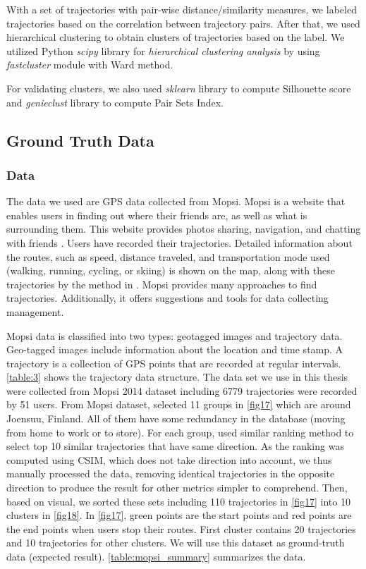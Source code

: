 \documentclass[a4paper, 12pt]{article}
\begin{document}
With a set of trajectories with pair-wise distance/similarity measures, we labeled trajectories based on the correlation between trajectory pairs. After that, we used hierarchical clustering to obtain clusters of trajectories based on the label. We utilized Python \textit{scipy} library for \textit{hierarchical clustering analysis} by using \textit{fastcluster} module with Ward method.

For validating clusters, we also used \textit{sklearn} library to compute Silhouette score and \textit{genieclust} library to compute Pair Sets Index.

\subsection{Ground Truth Data}

\subsubsection{Data}

The data we used are GPS data collected from Mopsi. Mopsi is a website that enables users in finding out where their friends are, as well as what is surrounding them. This website provides photos sharing, navigation, and chatting with friends \citep{mariescu2013detecting}. Users have recorded their trajectories. Detailed information about the routes, such as speed, distance traveled, and transportation mode used (walking, running, cycling, or skiing) is shown on the map, along with these trajectories by the method in \cite{waga2012detecting}. Mopsi provides many approaches to find trajectories. Additionally, it offers suggestions and tools for data collecting management. 

Mopsi data is classified into two types: geotagged images and trajectory data. Geo-tagged images include information about the location and time stamp. A trajectory is a collection of GPS points that are recorded at regular intervals. \autoref{table:3} shows the trajectory data structure. The data set we use in this thesis were collected from Mopsi 2014 dataset \citep{mariescu2017grid} including 6779 trajectories were recorded by 51 users. From Mopsi dataset, \cite{mariescu2020context} selected 11 groups in \autoref{fig17} which are around Joensuu, Finland. All of them have some redundancy in the database (moving from home to work or to store). For each group, \cite{mariescu2020context} used similar ranking method \citep{mariescu2014low} to select top 10 similar trajectories that have same direction. As the ranking was computed using CSIM, which does not take direction into account, we thus manually processed the data, removing identical trajectories in the opposite direction to produce the result for other metrics simpler to comprehend. Then, based on visual, we sorted these sets including 110 trajectories in \autoref{fig17} into 10 clusters in \autoref{fig18}. In \autoref{fig17}, green points are the start points and red points are the end points when users stop their routes. First cluster contains 20 trajectories and 10 trajectories for other clusters. We will use this dataset as ground-truth data (expected result). \autoref{table:mopsi_summary} summarizes the data.
\end{document}
